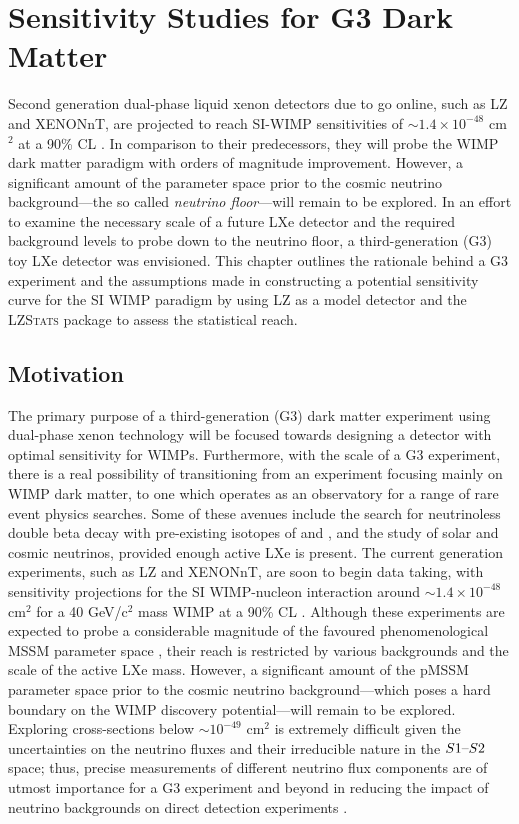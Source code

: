 \chapter{Sensitivity Studies for G3 Dark Matter}
\label{chap:chap6}

Second generation dual-phase liquid xenon detectors due to go online, such as LZ and XENONnT, are projected to reach SI-WIMP sensitivities of $\sim1.4 \times 10^{-48}$ cm$^{2}$ at a 90\% CL \cite{akerib2018projected, xenon_1t}. In comparison to their predecessors, they will probe the WIMP dark matter paradigm with orders of magnitude improvement. However, a significant amount of the parameter space prior to the cosmic neutrino background---the so called \textit{neutrino floor}---will remain to be explored. In an effort to examine the necessary scale of a future LXe detector and the required background levels to probe down to the neutrino floor, a third-generation (G3) toy LXe detector was envisioned. This chapter outlines the rationale behind a G3 experiment and the assumptions made in constructing a potential sensitivity curve for the SI WIMP paradigm by using LZ as a model detector and the \textsc{LZStats} package to assess the statistical reach. 


\section{Motivation}
\label{sec:motivation}

The primary purpose of a third-generation (G3) dark matter experiment using dual-phase xenon technology will be focused towards designing a detector with optimal sensitivity for WIMPs. Furthermore, with the scale of a G3 experiment, there is a real possibility of transitioning from an experiment focusing mainly on WIMP dark matter, to one which operates as an observatory for a range of rare event physics searches. Some of these avenues include the search for neutrinoless double beta decay with pre-existing isotopes of \XeOTF{} and \XeOTS{}, and the study of solar and cosmic neutrinos, provided enough active LXe is present. The current generation experiments, such as LZ and XENONnT, are soon to begin data taking, with sensitivity projections for the SI WIMP-nucleon interaction around $\sim1.4 \times 10^{-48}$ cm$^{2}$ for a 40 GeV/c$^{2}$ mass WIMP at a 90\% CL \cite{akerib2018projected, Aprile:2020vtw}. Although these experiments are expected to probe a considerable magnitude of the favoured phenomenological MSSM parameter space \cite{pMSSM11}, their reach is restricted by various backgrounds and the scale of the active LXe mass. However, a significant amount of the pMSSM parameter space prior to the cosmic neutrino background---which poses a hard boundary on the WIMP discovery potential---will remain to be explored. Exploring cross-sections below $\sim10^{-49}$ cm$^{2}$ is extremely difficult given the uncertainties on the neutrino fluxes and their irreducible nature in the $S1\text{--}{}S2$ space; thus, precise measurements of different neutrino flux components are of utmost importance for a G3 experiment and beyond in reducing the impact of neutrino backgrounds on direct detection experiments \cite{neutrino_floor}.

